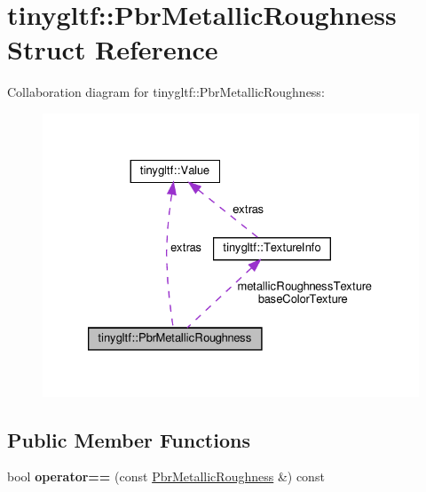 \hypertarget{structtinygltf_1_1PbrMetallicRoughness}{}\section{tinygltf\+:\+:Pbr\+Metallic\+Roughness Struct Reference}
\label{structtinygltf_1_1PbrMetallicRoughness}


Collaboration diagram for tinygltf\+:\+:Pbr\+Metallic\+Roughness\+:\nopagebreak
\begin{figure}[H]
\begin{center}
\leavevmode
\includegraphics[width=326pt]{structtinygltf_1_1PbrMetallicRoughness__coll__graph}
\end{center}
\end{figure}
\subsection*{Public Member Functions}
\begin{DoxyCompactItemize}
\item 
\mbox{\label{structtinygltf_1_1PbrMetallicRoughness_aed293ae5e20624b4ed35070c6c36430e}} 
bool {\bfseries operator==} (const \hyperlink{structtinygltf_1_1PbrMetallicRoughness}{Pbr\+Metallic\+Roughness} \&) const
\end{DoxyCompactItemize}
